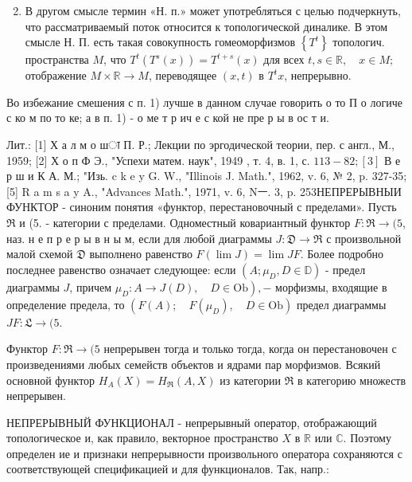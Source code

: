 \documentclass[10pt]{article}
\begin{document}
\begin{enumerate}

  \setcounter{enumi}{1}

  \item В другом смысле термин «Н. п.» может употребляться с целью подчеркнуть, что рассматриваемый поток относится к топологической диналике. В этом смысле Н. П. есть такая совокупность гомеоморфизмов $\left\{T^{t}\right\}$ топологич. пространства $M$, что $T^{t}\left(T^{s}(x)\right)=T^{t+s}(x)$ для всех $t, s \in \mathbb{R}, \quad x \in M ;$ отображение $M \times \mathbb{R} \rightarrow M$, переводящее $(x, t)$ в $T^{t} x$, непрерывно.

\end{enumerate}



Во избежание смешения с п. 1) лучше в данном случае говорить о то П о логиче с ко м по то ке; а в п. 1) - о ме т р ич е с кой не пре р ы в ос т и.



Лит.: [1] Х а л м о шा П. Р.; Лекции по эргодической теории, пер. с англ., М., 1959; [2] Х о п Ф Э., "Успехи матем. наук", 1949 , т. 4, в. 1, с. $113-82 ;[3]$ В е р ш и К А. М.; "Изь. c k e y G. W., "Illinois J. Math.", 1962, v. 6, № 2, p. 327-35; [5] R a m s a y A., "Advances Math.", 1971, v. 6, Nㅡ. 3, p. 253НЕПРЕРЫВНЫИ ФУНКТОР - синоним понятия «функтор, перестановочный с пределами». Пусть $\Re$ и (5. - категории с пределами. Одноместный ковариантный функтор $F: \mathfrak{R} \rightarrow(5$, наз. н е п р е р ы в н ы м, если для любой диаграммы $J: \mathfrak{D} \rightarrow \mathfrak{R}$ с произвольной малой схемой $\mathfrak{D}$ выполнено равенство $F(\lim J)=\lim J F$. Более подробно последнее равенство означает следующее: если $\left(A ; \mu_{D}, D \in \mathbb{D}\right)$ - предел диаграммы $J$, причем $\left.\mu_{D}: A \rightarrow J(D), \quad D \in \mathrm{Ob}\right),-$ морфизмы, входящие в определение предела, то $\left(F(A) ; \quad F\left(\mu_{D}\right), \quad D \in \mathrm{Ob}\right)$ предел диаграммы $J F: \mathfrak{L} \rightarrow(5$.



Функтор $F: \mathfrak{R} \rightarrow(5$ непрерывен тогда и только тогда, когда он перестановочен с произведениями любых семейств объектов и ядрами пар морфизмов. Всякий основной функтор $H_{A}(X)=H_{\Re}(A, X)$ из категории $\mathfrak{R}$ в категорию множеств непрерывен.



НЕПРЕРЫВНЫЙ ФУНКЦИОНАЛ - непрерывный оператор, отображающий топологическое и, как правило, векторное пространство $X$ в $\mathbb{R}$ или $\mathbb{C}$. Поэтому определен ие и признаки непрерывности произвольного оператора сохраняются с соответствующей спецификацией и для функционалов. Так, напр.:
\end{document}

